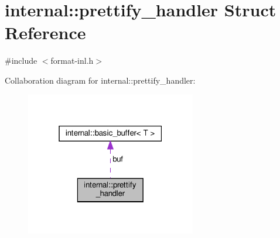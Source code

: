 \hypertarget{structinternal_1_1prettify__handler}{}\section{internal\+:\+:prettify\+\_\+handler Struct Reference}
\label{structinternal_1_1prettify__handler}


{\ttfamily \#include $<$format-\/inl.\+h$>$}



Collaboration diagram for internal\+:\+:prettify\+\_\+handler\+:
\nopagebreak
\begin{figure}[H]
\begin{center}
\leavevmode
\includegraphics[width=211pt]{structinternal_1_1prettify__handler__coll__graph}
\end{center}
\end{figure}
